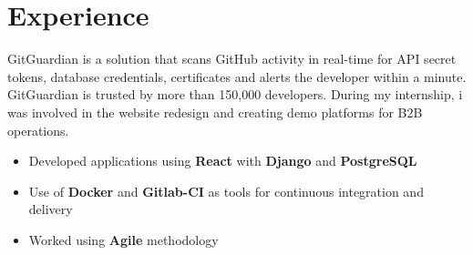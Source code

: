 \documentclass[a4paper]{deedy-resume} %
\begin{document}



\sectionspace
\sectionspace
{}
\sectionspace
\sectionspace


\section{Experience}


\begin{description}[leftmargin=*]
\item GitGuardian is a solution that scans GitHub activity in real-time for API secret tokens, database credentials, certificates and alerts the developer within a minute. GitGuardian is trusted by more than 150,000 developers.
During my internship, i was involved in the website redesign and creating demo platforms for B2B operations.
\begin{itemize}
\item Developed applications using \textbf{React} with \textbf{Django} and \textbf{PostgreSQL}
\item Use of \textbf{Docker} and \textbf{Gitlab-CI} as tools for continuous integration and delivery
\item Worked using \textbf{Agile} methodology
\end{itemize}
\end{description}

\end{document}
